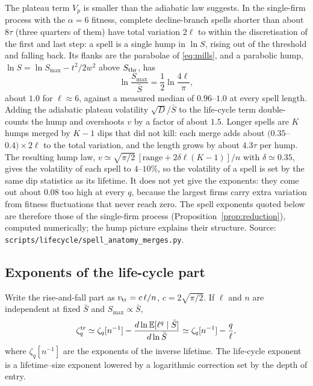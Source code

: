 \documentclass[11pt]{article}
\newcommand{\E}{\mathbb E}
\newcommand{\Sthr}{S_{\rm thr}}
\begin{document}
The plateau term $V_p$ is smaller than the adiabatic law suggests.  In the single-firm process
with the $\alpha=6$ fitness, complete decline-branch spells shorter than about $8\tau$ (three
quarters of them) have total variation $2\ell$ to within the discretisation of the first and last
step: a spell is a single hump in $\ln S$, rising out of the threshold and falling back.  Its flanks
are the parabolae of \eqref{eq:mills}, and a parabolic hump,
$\ln S=\ln S_{\max}-t^2/2w^2$ above $\Sthr$, has
\begin{equation}
  \ln\frac{S_{\max}}{\bar S}=\frac12\ln\frac{4\ell}{\pi},
  \label{eq:hump}
\end{equation}
about $1.0$ for $\ell\approx6$, against a measured median of $0.96$--$1.0$ at every spell length.  Adding
the adiabatic plateau volatility $\sqrt D/\bar S$ to the life-cycle term double-counts the hump and
overshoots $v$ by a factor of about $1.5$.  Longer spells are $K$ humps merged by $K-1$ dips that
did not kill: each merge adds about $(0.35$--$0.4)\times2\ell$ to the total variation, and the length
grows by about $4.3\tau$ per hump.  The resulting hump law,
$v\simeq\sqrt{\pi/2}\,[\text{range}+2\delta\ell(K-1)]/n$ with $\delta\simeq0.35$, gives the volatility
of each spell to $4$--$10\%$, so the volatility of a spell is set by the same dip statistics as its
lifetime.  It does not yet give the exponents: they come out about $0.08$ too high at every $q$,
because the largest firms carry extra variation from fitness fluctuations that never reach zero.
The spell exponents quoted below are therefore those of the single-firm process
(Proposition~\ref{prop:reduction}), computed numerically; the hump picture explains their structure.
Source: \texttt{scripts/lifecycle/spell\_anatomy\_merges.py}.

\subsection{Exponents of the life-cycle part}

Write the rise-and-fall part as $v_{\rm tr}=c\,\ell/n$, $c=2\sqrt{\pi/2}$.  If $\ell$ and $n$ are
independent at fixed $\bar S$ and $S_{\max}\propto\bar S$,
\begin{equation}
  \zeta_q^{\rm tr}\simeq\zeta_q[n^{-1}]-\frac{d\ln\E[\ell^q\mid\bar S]}{d\ln\bar S}
  \simeq\zeta_q[n^{-1}]-\frac q\ell ,
  \label{eq:lifetimerep}
\end{equation}
where $\zeta_q[n^{-1}]$ are the exponents of the inverse lifetime.  The life-cycle exponent is a
lifetime--size exponent lowered by a logarithmic correction set by the depth of entry.
\end{document}
